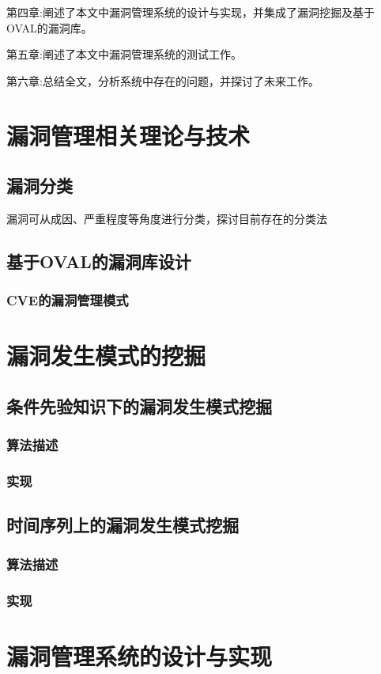 \documentclass[a4paper]{ctexrep}
\begin{document}
		第四章:阐述了本文中漏洞管理系统的设计与实现，并集成了漏洞挖掘及基于OVAL的漏洞库。

		第五章:阐述了本文中漏洞管理系统的测试工作。
		
		第六章:总结全文，分析系统中存在的问题，并探讨了未来工作。
	\chapter{漏洞管理相关理论与技术}
		\section{漏洞分类}
		漏洞可从成因、严重程度等角度进行分类，探讨目前存在的分类法
		\section{基于OVAL的漏洞库设计}
			\subsection{CVE的漏洞管理模式}
	\chapter{漏洞发生模式的挖掘}
		\section{条件先验知识下的漏洞发生模式挖掘}
			\subsection{算法描述}
			\subsection{实现}
		\section{时间序列上的漏洞发生模式挖掘}
			\subsection{算法描述}
			\subsection{实现}
	\chapter{漏洞管理系统的设计与实现}
\end{document}
